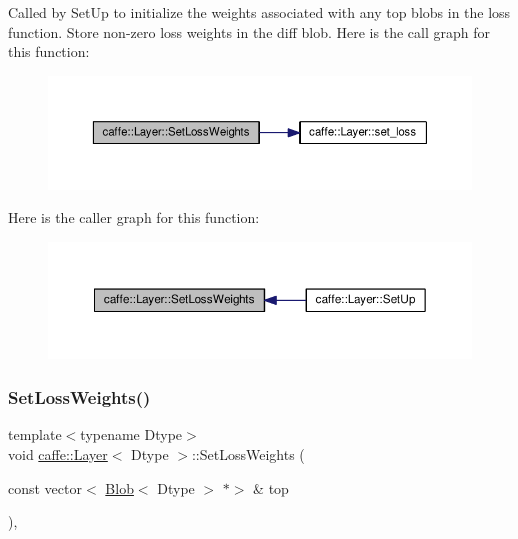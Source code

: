 Called by Set\+Up to initialize the weights associated with any top blobs in the loss function. Store non-\/zero loss weights in the diff blob. Here is the call graph for this function\+:
\nopagebreak
\begin{figure}[H]
\begin{center}
\leavevmode
\includegraphics[width=350pt]{classcaffe_1_1_layer_a04eb2a3d1d59c64cd64c233217d5d6fc_cgraph}
\end{center}
\end{figure}
Here is the caller graph for this function\+:
\nopagebreak
\begin{figure}[H]
\begin{center}
\leavevmode
\includegraphics[width=350pt]{classcaffe_1_1_layer_a04eb2a3d1d59c64cd64c233217d5d6fc_icgraph}
\end{center}
\end{figure}
\mbox{\label{classcaffe_1_1_layer_a04eb2a3d1d59c64cd64c233217d5d6fc}} 
\subsubsection{\texorpdfstring{Set\+Loss\+Weights()}{SetLossWeights()}\hspace{0.1cm}{\footnotesize\ttfamily [2/2]}}
{\footnotesize\ttfamily template$<$typename Dtype$>$ \\
void \mbox{\hyperlink{classcaffe_1_1_layer}{caffe\+::\+Layer}}$<$ Dtype $>$\+::Set\+Loss\+Weights (\begin{DoxyParamCaption}\item[{const vector$<$ \mbox{\hyperlink{classcaffe_1_1_blob}{Blob}}$<$ Dtype $>$ $\ast$$>$ \&}]{top }\end{DoxyParamCaption})\hspace{0.3cm}{\ttfamily [inline]}, {\ttfamily [protected]}}

